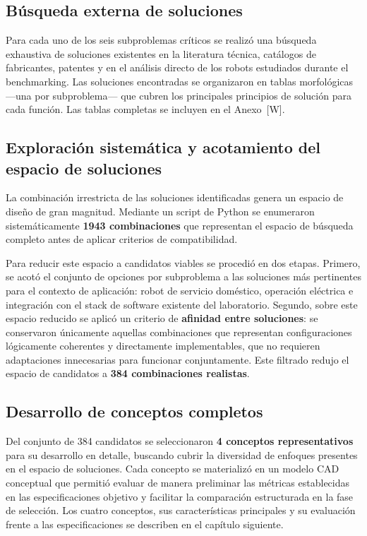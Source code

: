 \subsection{Búsqueda externa de soluciones}

Para cada uno de los seis subproblemas críticos se realizó una búsqueda exhaustiva de soluciones existentes en la literatura técnica, catálogos de fabricantes, patentes y en el análisis directo de los robots estudiados durante el benchmarking. Las soluciones encontradas se organizaron en tablas morfológicas ---una por subproblema--- que cubren los principales principios de solución para cada función. Las tablas completas se incluyen en el Anexo~[W].

\subsection{Exploración sistemática y acotamiento del espacio de soluciones}

La combinación irrestricta de las soluciones identificadas genera un espacio de diseño de gran magnitud. Mediante un script de Python se enumeraron sistemáticamente \textbf{1943 combinaciones} que representan el espacio de búsqueda completo antes de aplicar criterios de compatibilidad.

Para reducir este espacio a candidatos viables se procedió en dos etapas. Primero, se acotó el conjunto de opciones por subproblema a las soluciones más pertinentes para el contexto de aplicación: robot de servicio doméstico, operación eléctrica e integración con el stack de software existente del laboratorio. Segundo, sobre este espacio reducido se aplicó un criterio de \textbf{afinidad entre soluciones}: se conservaron únicamente aquellas combinaciones que representan configuraciones lógicamente coherentes y directamente implementables, que no requieren adaptaciones innecesarias para funcionar conjuntamente. Este filtrado redujo el espacio de candidatos a \textbf{384 combinaciones realistas}.

\subsection{Desarrollo de conceptos completos}

Del conjunto de 384 candidatos se seleccionaron \textbf{4 conceptos representativos} para su desarrollo en detalle, buscando cubrir la diversidad de enfoques presentes en el espacio de soluciones. Cada concepto se materializó en un modelo CAD conceptual que permitió evaluar de manera preliminar las métricas establecidas en las especificaciones objetivo y facilitar la comparación estructurada en la fase de selección. Los cuatro conceptos, sus características principales y su evaluación frente a las especificaciones se describen en el capítulo siguiente.
